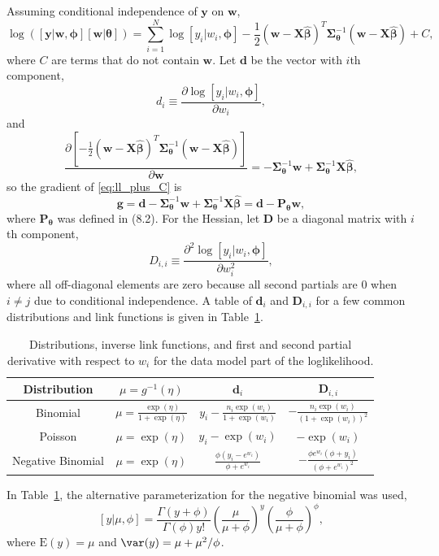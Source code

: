 \documentclass[12pt, titlepage]{article}
\begin{document}
Assuming conditional independence of $\mathbf{y}$ on $\mathbf{w}$,
\begin{equation} \label{eq:ll_plus_C}
\log([\mathbf{y}|\mathbf{w},\boldsymbol{\phi}][\mathbf{w}|\boldsymbol{\theta}]) = \sum_{i = 1}^N \log[y_i|w_i,\boldsymbol{\phi}] - \frac{1}{2}(\mathbf{w} - \mathbf{X}\hat{\boldsymbol{\beta}})^{T}\boldsymbol{\Sigma}_{\boldsymbol{\theta}}^{-1}(\mathbf{w} - \mathbf{X}\hat{\boldsymbol{\beta}}) + C,
\end{equation}
where $C$ are terms that do not contain $\mathbf{w}$. Let $\mathbf{d}$ be the vector with $i$th component,
$$
d_{i} \equiv \frac{\partial\log[y_i|w_i,\boldsymbol{\phi}]}{\partial w_i},
$$
and
$$
\frac{\partial [-\frac{1}{2}(\mathbf{w} - \mathbf{X}\hat{\boldsymbol{\beta}})^{T}\boldsymbol{\Sigma}_{\boldsymbol{\theta}}^{-1}(\mathbf{w} - \mathbf{X}\hat{\boldsymbol{\beta}})]}{\partial \mathbf{w}} = -\boldsymbol{\Sigma}_{\boldsymbol{\theta}}^{-1}\mathbf{w} + \boldsymbol{\Sigma}_{\boldsymbol{\theta}}^{-1}\boldsymbol{X}\hat{\boldsymbol{\beta}},
$$
so the gradient of \eqref{eq:ll_plus_C} is
$$
\mathbf{g} = \mathbf{d} - \boldsymbol{\Sigma}_{\boldsymbol{\theta}}^{-1}\mathbf{w} + \boldsymbol{\Sigma}_{\boldsymbol{\theta}}^{-1}\mathbf{X}\hat{\boldsymbol{\beta}} = \mathbf{d} - \mathbf{P}_{\boldsymbol{\theta}}\mathbf{w},
$$
where $\mathbf{P}_{\boldsymbol{\theta}}$ was defined in (8.2). For the Hessian, let $\mathbf{D}$ be a diagonal matrix with $i$th component,
$$
D_{i,i} \equiv \frac{\partial^2\log[y_i|w_i,\boldsymbol{\phi}]}{\partial w_i^2},
$$
where all off-diagonal elements are zero because all second partials are 0 when $i \neq j$ due to conditional independence. A table of $\mathbf{d}_{i}$ and $\mathbf{D}_{i,i}$ for a few common distributions and link functions is given in Table~\ref{tab:dDlinkDist}.
\begin{table}[H] 
	\caption{Distributions, inverse link functions, and first and second partial derivative with respect to $w_{i}$ for the data model part of the loglikelihood.  \label{tab:dDlinkDist}}
\begin{center}
\begin{tabular}{|c|ccc|}
\hline
\hline
Distribution & $\mu = g^{-1}(\eta)$ & $\mathbf{d}_{i}$ & $\mathbf{D}_{i,i}$ \\
\hline
Binomial & $\mu =\frac{\exp(\eta)}{1+\exp(\eta)}$ & $y_{i} - \frac{n_{i}\exp(w_{i})}{1+\exp(w_{i})}$ & $- \frac{n_{i}\exp(w_{i})}{(1+\exp(w_{i}))^{2}}$ \\ 
Poisson & $\mu = \exp(\eta)$ & $y_{i} - \exp(w_{i})$ & $- \exp(w_{i})$ \\ 
Negative Binomial & $\mu = \exp(\eta)$ &  $
\frac{\phi(y_{i} - e^{w_{i}})}{\phi + e^{w_{i}}}$ & $-\frac{\phi e^{w_{i}}(\phi + y_{i})}{(\phi + e^{w_{i}})^{2}}$ \\ 
\hline
\hline
\end{tabular}
\end{center}
\end{table}
{\flushleft In Table~\ref{tab:dDlinkDist}, the alternative parameterization for the negative binomial was used,}
$$
[y|\mu,\phi] = 
\frac{\Gamma(y + \phi)}{\Gamma(\phi)y!}
\left(
\frac{\mu}{\mu + \phi}
\right)^{y}
\left(
\frac{\phi}{\mu + \phi}
\right)^{\phi},
$$
where $\textrm{E}(y) = \mu$ and $\var(y) = \mu + \mu^{2}/\phi$.
\end{document}
